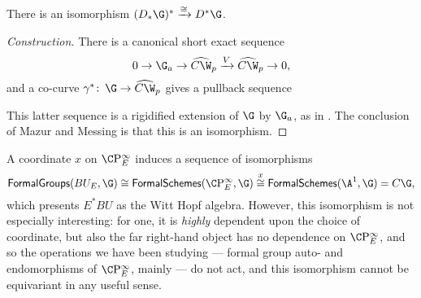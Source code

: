 \begin{corollary}
There is an isomorphism $(D_* \G)^* \xrightarrow\cong D^* \G$.
\end{corollary}
\begin{proof}[Construction]
There is a canonical short exact sequence \[0 \to \G_a \to \widehat{C\W}_p \xrightarrow{V} \widehat{C\W}_p \to 0,\] and a co-curve $\gamma^*\co \G \to \widehat{C\W}_p$ gives a pullback sequence
\begin{center}
\end{center}
This latter sequence is a rigidified extension of $\G$ by $\G_a$, as in .  The conclusion of Mazur and Messing is that this is an isomorphism.
\end{proof}





\begin{remark}
A coordinate $x$ on $\CP^\infty_E$ induces a sequence of isomorphisms \[\CatOf{FormalGroups}(BU_E, \G) \cong \CatOf{FormalSchemes}(\CP^\infty_E, \G) \stackrel{x}{\cong} \CatOf{FormalSchemes}(\A^1, \G) = C\G,\] which presents $E^* BU$ as the Witt Hopf algebra.  However, this isomorphism is not especially interesting: for one, it is \emph{highly} dependent upon the choice of coordinate, but also the far right-hand object has no dependence on $\CP^\infty_E$, and so the operations we have been studying --- formal group auto- and endomorphisms of $\CP^\infty_E$, mainly --- do not act, and this isomorphism cannot be equivariant in any useful sense.
\end{remark}

